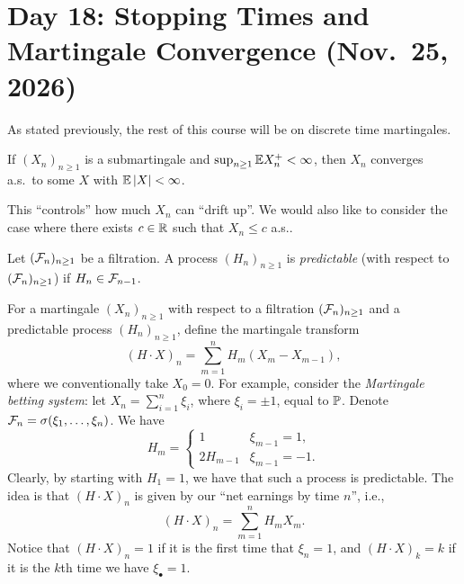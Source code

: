 \section{Day 18: Stopping Times and Martingale Convergence (Nov.\ 25, 2026)}
{\color{amethyst} As stated previously, the rest of this course will be on discrete time martingales.}

\begin{theorem} \label{thm:martingale_convergence_theorem}
    If $(X_n)_{n \geq 1}$ is a submartingale and $\sup_{n \geq 1} \mathbb E X_n^+ < \infty$, then $X_n$ converges a.s.\ to some $X$ with $\mathbb E \left\lvert X \right\rvert < \infty$.
\end{theorem}
{\color{amethyst} This ``controls'' how much $X_n$ can ``drift up''.} We would also like to consider the case where there exists $c \in \mathbb R$ such that $X_n \leq c$ a.s..
\begin{definition} \label{def:predictability}
    Let $(\mathcal F_n)_{n \geq 1}$ be a filtration. A process $(H_n)_{n \geq 1}$ is \textit{predictable} (with respect to $(\mathcal F_n)_{n \geq 1}$) if $H_n \in \mathcal F_{n-1}$.
\end{definition}
For a martingale $(X_n)_{n \geq 1}$ with respect to a filtration $(\mathcal F_n)_{n \geq 1}$ and a predictable process $(H_n)_{n \geq 1}$, define the martingale transform
\[ (H \cdot X)_n = \sum_{m=1}^n H_m(X_m - X_{m-1}), \]
where we conventionally take $X_0 = 0$. For example, consider the \textit{Martingale betting system}: let $X_n = \sum_{i=1}^n \xi_i$, where $\xi_i = \pm 1$, equal to $\mathbb P$. Denote $\mathcal F_n = \sigma(\xi_1, \dots, \xi_n)$. We have
\[ H_m = \begin{cases} 1 & \xi_{m-1} = 1, \\ 2 H_{m-1} & \xi_{m-1} = -1. \end{cases} \]
Clearly, by starting with $H_1 = 1$, we have that such a process is predictable. The idea is that $(H \cdot X)_n$ is given by our ``net earnings by time $n$'', i.e.,
\[ (H \cdot X)_n = \sum_{m=1}^n H_m X_m. \]
Notice that $(H \cdot X)_n = 1$ if it is the first time that $\xi_n = 1$, and $(H \cdot X)_k = k$ if it is the $k$th time we have $\xi_\bullet = 1$.

